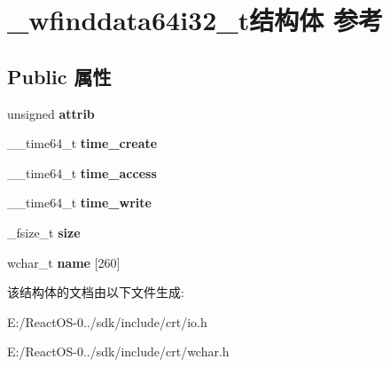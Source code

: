 \hypertarget{struct__wfinddata64i32__t}{}\section{\+\_\+wfinddata64i32\+\_\+t结构体 参考}
\label{struct__wfinddata64i32__t}
\subsection*{Public 属性}
\begin{DoxyCompactItemize}
\item 
\mbox{\label{struct__wfinddata64i32__t_ae3b93277209ab83c03ab4d135a0e4b8f}} 
unsigned {\bfseries attrib}
\item 
\mbox{\label{struct__wfinddata64i32__t_a58fc0bb652be28bd1ebd029dd881ff74}} 
\+\_\+\+\_\+time64\+\_\+t {\bfseries time\+\_\+create}
\item 
\mbox{\label{struct__wfinddata64i32__t_a0e22aa16d84e3606b0c2972235a5feb7}} 
\+\_\+\+\_\+time64\+\_\+t {\bfseries time\+\_\+access}
\item 
\mbox{\label{struct__wfinddata64i32__t_aa764a27ce42b3da45c0375a04fd03c68}} 
\+\_\+\+\_\+time64\+\_\+t {\bfseries time\+\_\+write}
\item 
\mbox{\label{struct__wfinddata64i32__t_a778c9f0bb79d5c7e473938adadc6f7e9}} 
\+\_\+fsize\+\_\+t {\bfseries size}
\item 
\mbox{\label{struct__wfinddata64i32__t_a4d41c193f7b6fdb7765dd35e1556420b}} 
wchar\+\_\+t {\bfseries name} \mbox{[}260\mbox{]}
\end{DoxyCompactItemize}


该结构体的文档由以下文件生成\+:\begin{DoxyCompactItemize}
\item 
E\+:/\+React\+O\+S-\/0../sdk/include/crt/io.\+h\item 
E\+:/\+React\+O\+S-\/0../sdk/include/crt/wchar.\+h\end{DoxyCompactItemize}
